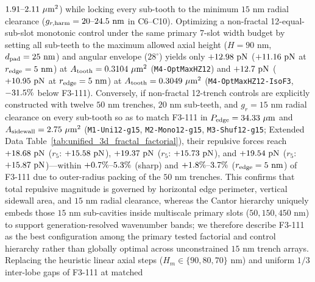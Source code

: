 \documentclass[pdflatex,sn-nature]{sn-jnl}
\DeclareRobustCommand{\roundone}[1]{\fpeval{round(#1,1)}}
\DeclareRobustCommand{\roundtwo}[1]{\fpeval{round(#1,2)}}
\DeclareRobustCommand{\roundfour}[1]{\fpeval{round(#1,4)}}
\begin{document}
$\roundtwo{\NthreeUnithreedCtrlOutphaseonetwoAswUmtwo}\text{--}\roundtwo{\NthreeUnithreedCtrlMonoonetwoAswUmtwo}\ \mu\text{m}^2$) while locking every sub-tooth to the minimum $15\text{ nm}$ radial clearance ($g_{r,\rm harm} = \roundone{\NthreeUnithreedCtrlShufonetwoGrHarmNm}\text{--}\roundone{\NthreeUnithreedCtrlLinonetwoGrHarmNm}\text{ nm}$ in C6--C10). Optimizing a non-fractal 12-equal-sub-slot monotonic control under the same primary 7-slot width budget by setting all sub-teeth to the maximum allowed axial height ($H = 90\text{ nm}$, $d_{\rm pad}=25\text{ nm}$) and angular envelope ($28^\circ$) yields only $+\roundtwo{\NthreeOptMfourOptmaxhzonetwoFzPn}\text{ pN}$ ($+\roundtwo{\NthreeOptMfourOptmaxhzonetwoRfivenmFzPn}\text{ pN}$ at $r_{\rm edge}=5\text{ nm}$) at $A_{\rm tooth} = \roundfour{\NthreeOptMfourOptmaxhzonetwoAreaUmtwo}\ \mu\text{m}^2$ (\texttt{M4-OptMaxHZ12}) and $+\roundtwo{\NthreeOptMfourOptmaxhzonetwoIsofthreeFzPn}\text{ pN}$ ($+\roundtwo{\NthreeOptMfourOptmaxhzonetwoIsofthreeRfivenmFzPn}\text{ pN}$ at $r_{\rm edge}=5\text{ nm}$) at $A_{\rm tooth} = \roundfour{\NthreeOptMfourOptmaxhzonetwoIsofthreeAreaUmtwo}\ \mu\text{m}^2$ (\texttt{M4-OptMaxHZ12-IsoF3}, $\roundone{\NthreeOptDiffMfourOptmaxhzonetwoIsofthreeVsFoneoneonePct}\%$ below F3-111). Conversely, if non-fractal 12-trench controls are explicitly constructed with twelve $50\text{ nm}$ trenches, $20\text{ nm}$ sub-teeth, and $g_r = 15\text{ nm}$ radial clearance on every sub-tooth so as to match F3-111 in $P_{\rm edge} = \roundtwo{\NthreeOptMoneUnionetwoGonefivePedgeUm}\ \mu\text{m}$ and $A_{\rm sidewall} = \roundtwo{\NthreeOptMoneUnionetwoGonefiveAswUmtwo}\ \mu\text{m}^2$ (\texttt{M1-Uni12-g15}, \texttt{M2-Mono12-g15}, \texttt{M3-Shuf12-g15}; Extended Data Table~\ref{tab:unified_3d_fractal_factorial}), their repulsive forces reach $+\roundtwo{\NthreeOptMoneUnionetwoGonefiveFzPn}\text{ pN}$ ($r_5$: $+\roundtwo{\NthreeOptMoneUnionetwoGonefiveRfivenmFzPn}\text{ pN}$), $+\roundtwo{\NthreeOptMtwoMonoonetwoGonefiveFzPn}\text{ pN}$ ($r_5$: $+\roundtwo{\NthreeOptMtwoMonoonetwoGonefiveRfivenmFzPn}\text{ pN}$), and $+\roundtwo{\NthreeOptMthreeShufonetwoGonefiveFzPn}\text{ pN}$ ($r_5$: $+\roundtwo{\NthreeOptMthreeShufonetwoGonefiveRfivenmFzPn}\text{ pN}$)---within $+\roundone{\NthreeOptDiffMoneUnionetwoGonefiveVsFoneoneonePct}\%\text{--}\roundone{\NthreeOptDiffMthreeShufonetwoGonefiveVsFoneoneonePct}\%$ (sharp) and $+\roundone{\NthreeOptDiffMoneUnionetwoGonefiveVsFoneoneoneRfivenmPct}\%\text{--}\roundone{\NthreeOptDiffMthreeShufonetwoGonefiveVsFoneoneoneRfivenmPct}\%$ ($r_{\rm edge}=5\text{ nm}$) of F3-111 due to outer-radius packing of the $50\text{ nm}$ trenches. This confirms that total repulsive magnitude is governed by horizontal edge perimeter, vertical sidewall area, and $15\text{ nm}$ radial clearance, whereas the Cantor hierarchy uniquely embeds those $15\text{ nm}$ sub-cavities inside multiscale primary slots ($50, 150, 450\text{ nm}$) to support generation-resolved wavenumber bands; we therefore describe F3-111 as the best configuration among the primary tested factorial and control hierarchy rather than globally optimal across unconstrained $15\text{ nm}$ trench arrays. Replacing the heuristic linear axial steps ($H_m \in \{90, 80, 70\}\text{ nm}$) and uniform $1/3$ inter-lobe gaps of F3-111 at matched 
\end{document}
